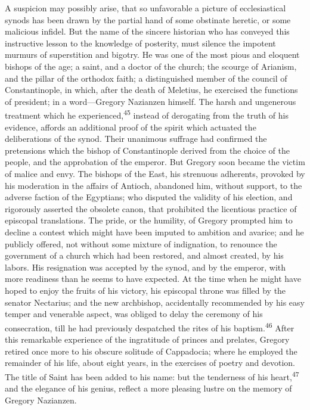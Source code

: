 A suspicion may possibly arise, that so unfavorable a picture of
ecclesiastical synods has been drawn by the partial hand of some
obstinate heretic, or some malicious infidel. But the name of the
sincere historian who has conveyed this instructive lesson to the
knowledge of posterity, must silence the impotent murmurs of
superstition and bigotry. He was one of the most pious and
eloquent bishops of the age; a saint, and a doctor of the church;
the scourge of Arianism, and the pillar of the orthodox faith; a
distinguished member of the council of Constantinople, in which,
after the death of Meletius, he exercised the functions of
president; in a word—Gregory Nazianzen himself. The harsh and
ungenerous treatment which he experienced,\textsuperscript{45} instead of
derogating from the truth of his evidence, affords an additional
proof of the spirit which actuated the deliberations of the
synod. Their unanimous suffrage had confirmed the pretensions
which the bishop of Constantinople derived from the choice of the
people, and the approbation of the emperor. But Gregory soon
became the victim of malice and envy. The bishops of the East,
his strenuous adherents, provoked by his moderation in the
affairs of Antioch, abandoned him, without support, to the
adverse faction of the Egyptians; who disputed the validity of
his election, and rigorously asserted the obsolete canon, that
prohibited the licentious practice of episcopal translations. The
pride, or the humility, of Gregory prompted him to decline a
contest which might have been imputed to ambition and avarice;
and he publicly offered, not without some mixture of indignation,
to renounce the government of a church which had been restored,
and almost created, by his labors. His resignation was accepted
by the synod, and by the emperor, with more readiness than he
seems to have expected. At the time when he might have hoped to
enjoy the fruits of his victory, his episcopal throne was filled
by the senator Nectarius; and the new archbishop, accidentally
recommended by his easy temper and venerable aspect, was obliged
to delay the ceremony of his consecration, till he had previously
despatched the rites of his baptism.\textsuperscript{46} After this remarkable
experience of the ingratitude of princes and prelates, Gregory
retired once more to his obscure solitude of Cappadocia; where he
employed the remainder of his life, about eight years, in the
exercises of poetry and devotion. The title of Saint has been
added to his name: but the tenderness of his heart,\textsuperscript{47} and the
elegance of his genius, reflect a more pleasing lustre on the
memory of Gregory Nazianzen.

